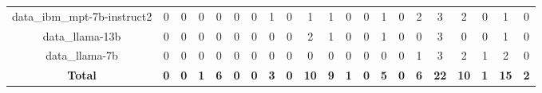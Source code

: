 \begin{table}[t]
\begin{tabular}{c|cc|cc|cc|cc|cc|cc|cc|cc|cc|cc}
data\_ibm\_mpt-7b-instruct2 & 0  & 0 & 0  & 0 & 0  & 0 & 1  & 0 & 1  & 1 & 0  & 0 & 1  & 0 & 2  & 3 & 2  & 0 & 1  & 0 \\
data\_llama-13b & 0  & 0 & 0  & 0 & 0  & 0 & 0  & 0 & 2  & 1 & 0  & 0 & 1  & 0 & 0  & 3 & 0  & 0 & 1  & 0 \\
data\_llama-7b & 0  & 0 & 0  & 0 & 0  & 0 & 0  & 0 & 0  & 0 & 0  & 0 & 0  & 0 & 1  & 3 & 2  & 1 & 2  & 0 \\
\hline
\textbf{Total} & \textbf{0}  & \textbf{0} & \textbf{1}  & \textbf{6} & \textbf{0}  & \textbf{0} & \textbf{3}  & \textbf{0} & \textbf{10}  & \textbf{9} & \textbf{1}  & \textbf{0} & \textbf{5}  & \textbf{0} & \textbf{6}  & \textbf{22} & \textbf{10}  & \textbf{1} & \textbf{15}  & \textbf{2} \\
\hline
\end{tabular}
\end{table}